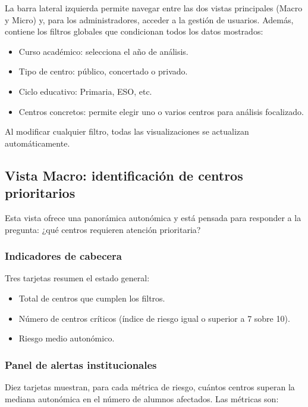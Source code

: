 La barra lateral izquierda permite navegar entre las dos vistas principales (Macro y Micro) y, para los administradores, acceder a la gestión de usuarios. Además, contiene los filtros globales que condicionan todos los datos mostrados:

\begin{itemize}
    \item Curso académico: selecciona el año de análisis.
    \item Tipo de centro: público, concertado o privado.
    \item Ciclo educativo: Primaria, ESO, etc.
    \item Centros concretos: permite elegir uno o varios centros para análisis focalizado.
\end{itemize}

Al modificar cualquier filtro, todas las visualizaciones se actualizan automáticamente.

\subsection{Vista Macro: identificación de centros prioritarios}

Esta vista ofrece una panorámica autonómica y está pensada para responder a la pregunta: ¿qué centros requieren atención prioritaria?

\subsubsection{Indicadores de cabecera}

Tres tarjetas resumen el estado general:
\begin{itemize}
    \item Total de centros que cumplen los filtros.
    \item Número de centros críticos (índice de riesgo igual o superior a 7 sobre 10).
    \item Riesgo medio autonómico.
\end{itemize}

\subsubsection{Panel de alertas institucionales}

Diez tarjetas muestran, para cada métrica de riesgo, cuántos centros superan la mediana autonómica en el número de alumnos afectados. Las métricas son:

